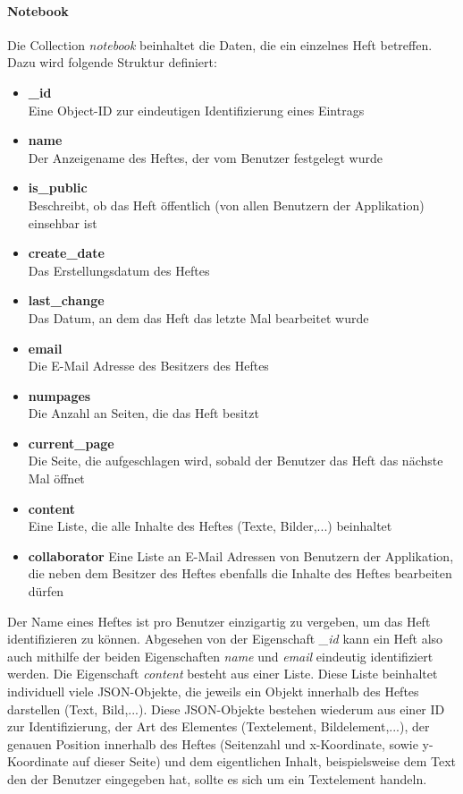 \paragraph{Notebook}
Die Collection \textit{notebook} beinhaltet die Daten, die ein einzelnes Heft betreffen. Dazu wird folgende Struktur definiert:
\begin{itemize}
\item \textbf{\_id}\\ Eine Object-ID zur eindeutigen Identifizierung eines Eintrags
\item \textbf{name}\\ Der Anzeigename des Heftes, der vom Benutzer festgelegt wurde
\item \textbf{is\_public}\\ Beschreibt, ob das Heft öffentlich (von allen Benutzern der Applikation) einsehbar ist
\item \textbf{create\_date}\\ Das Erstellungsdatum des Heftes
\item \textbf{last\_change}\\ Das Datum, an dem das Heft das letzte Mal bearbeitet wurde
\item \textbf{email}\\ Die E-Mail Adresse des Besitzers des Heftes
\item \textbf{numpages}\\ Die Anzahl an Seiten, die das Heft besitzt
\item \textbf{current\_page}\\ Die Seite, die aufgeschlagen wird, sobald der Benutzer das Heft das nächste Mal öffnet
\item \textbf{content}\\ Eine Liste, die alle Inhalte des Heftes (Texte, Bilder,...) beinhaltet
\item \textbf{collaborator} Eine Liste an E-Mail Adressen von Benutzern der Applikation, die neben dem Besitzer des Heftes ebenfalls die Inhalte des Heftes bearbeiten dürfen
\end{itemize}
Der Name eines Heftes ist pro Benutzer einzigartig zu vergeben, um das Heft identifizieren zu können. Abgesehen von der Eigenschaft \textit{\_id} kann ein Heft also auch mithilfe der beiden Eigenschaften \textit{name} und \textit{email} eindeutig identifiziert werden. Die Eigenschaft \textit{content} besteht aus einer Liste. Diese Liste beinhaltet individuell viele JSON-Objekte, die jeweils ein Objekt innerhalb des Heftes darstellen (Text, Bild,...). Diese JSON-Objekte bestehen wiederum aus einer ID zur Identifizierung, der Art des Elementes (Textelement, Bildelement,...), der genauen Position innerhalb des Heftes (Seitenzahl und x-Koordinate, sowie y-Koordinate auf dieser Seite) und dem eigentlichen Inhalt, beispielsweise dem Text den der Benutzer eingegeben hat, sollte es sich um ein Textelement handeln.

